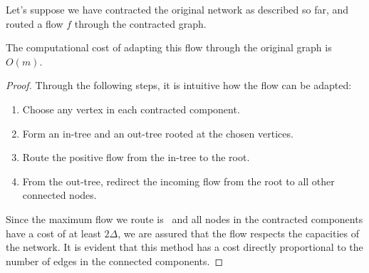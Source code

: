     \begin{lemma}
        \label{fixCont}
        Let's suppose we have contracted the original network as described so far, and routed a flow $f$ through the contracted graph.

        The computational cost of adapting this flow through the original graph is $O(m)$.
    \end{lemma}
    \begin{proof}

        Through the following steps, it is intuitive how the flow can be adapted:

        \begin{enumerate}[nolistsep] 
            \item Choose any vertex in each contracted component. 
            \item Form an in-tree and an out-tree rooted at the chosen vertices. 
            \item Route the positive flow from the in-tree to the root. 
            \item From the out-tree, redirect the incoming flow from the root to all other connected nodes. 
        \end{enumerate}

    Since the maximum flow we route is \dlt\ and all nodes in the contracted components have a cost of at least $2\Delta$, we are assured that the flow respects the capacities of the network.
    It is evident that this method has a cost directly proportional to the number of edges in the connected components.
    \end{proof}

